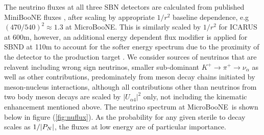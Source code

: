 \documentclass[11pt, a4paper]{article}
\def\muboone{MicroBooNE}
\def\ster{\ensuremath N}
\begin{document}
The neutrino fluxes at all three SBN detectors are calculated from published
MiniBooNE fluxes \cite{AguilarArevalo:2008yp}, after scaling by appropriate
$1/r^2$ baseline dependence, e.g $(470/540)^2 \approx 1.3$ at \muboone. This
is similarly scaled by $1/r^2$ for ICARUS at 600m, however, an additional
energy dependent flux modifier is applied for SBND at 110m to account for the
softer energy spectrum due to the proximity of the detector to the production
target \cite{Antonello:2015lea}. We consider sources of neutrinos that are
relavent including wrong sign neutrinos, smaller sub-dominant $K^+\rightarrow
\pi^+\rightarrow \nu_\alpha$ as well as other contributions, predominately from
meson decay chains initiated by meson-nucleus interactions, although all
contributions other than neutrinos from two body meson decays are scaled by
$|U_{\alpha 4}|^2$ only, not including the kinematic enhancement mentioned
above. The neutrino spectrum at \muboone\ is shown below in figure
(\ref{fig:nuflux}). As the probability for any given sterile to decay scales as
$1/|P_{\ster}|$, the fluxes at low energy are of particular importance. 
\end{document}
